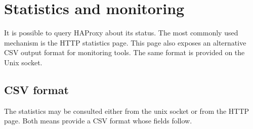 \chapter{Statistics and monitoring}
\label{chap:statistics_monitoring}

It is possible to query HAProxy about its status. The most commonly used
mechanism is the HTTP statistics page. This page also exposes an alternative
CSV output format for monitoring tools. The same format is provided on the
Unix socket.

\section{CSV format}
\label{sec:csv_format}

The statistics may be consulted either from the unix socket or from the HTTP
page. Both means provide a CSV format whose fields follow.

